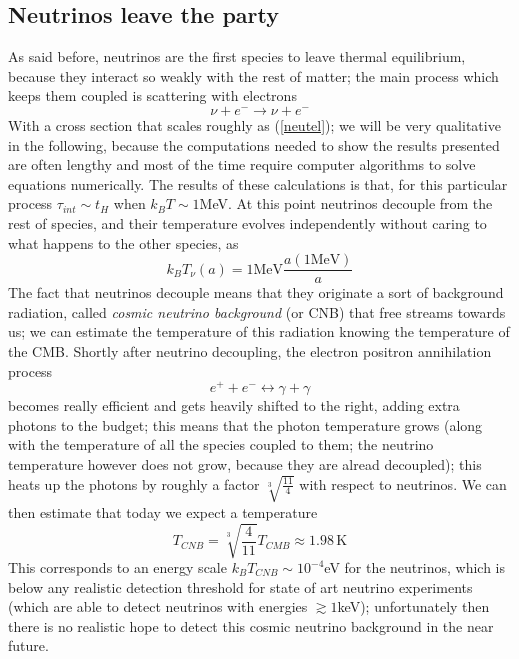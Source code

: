 \documentclass[11pt, a4paper,oneside,openright]{book}
\numberwithin{equation}{section}
\begin{document}
\subsection{Neutrinos leave the party}
As said before, neutrinos are the first species to leave thermal equilibrium, because they interact so weakly with the rest of matter; the main process which keeps them coupled is scattering with electrons
\begin{equation}
\nu + e^- \rightarrow \nu + e^-
\end{equation}
With a cross section that scales roughly as (\ref{neutel}); we will be very qualitative in the following, because the computations needed to show the results presented are often lengthy and most of the time require computer algorithms to solve equations numerically. The results of these calculations is that, for this particular process $\tau_{int}\sim t_H$ when $k_BT\sim 1$MeV. At this point neutrinos decouple from the rest of species, and their temperature evolves independently without caring to what happens to the other species, as
\begin{equation}
k_BT_\nu(a)=1\mathrm{MeV}\frac{a(1\mathrm{MeV})}{a}
\end{equation}
The fact that neutrinos decouple means that they originate a sort of background radiation, called \textit{cosmic neutrino background} (or CNB) that free streams towards us; we can estimate the temperature of this radiation knowing the temperature of the CMB. Shortly after  neutrino decoupling, the electron positron annihilation process
\begin{equation}
e^+ + e^- \leftrightarrow \gamma+ \gamma
\end{equation}
becomes really efficient and gets heavily shifted to the right, adding extra photons to the budget; this means that the photon temperature grows (along with the temperature of all the species coupled to them; the neutrino temperature however does not grow, because they are alread decoupled); this heats up the photons by roughly a factor $\sqrt[3]{\frac{11}{4}}$ with respect to neutrinos. We can then estimate that today we expect a temperature
\begin{equation}
T_{CNB}=\sqrt[3]{\frac{4}{11}}T_{CMB}\approx 1.98\,\mathrm{K}
\end{equation}
This corresponds to an energy scale $k_BT_{CNB}\sim 10^{-4}$eV for the neutrinos, which is below any realistic detection threshold for state of art neutrino experiments (which are able to detect neutrinos with energies $\gtrsim 1$keV); unfortunately then there is no realistic hope to detect this cosmic neutrino background in the near future. 
\end{document}
